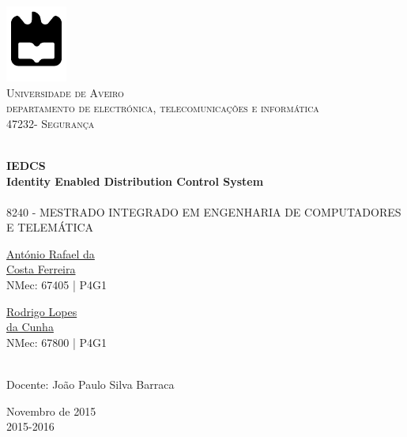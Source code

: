 \begin{titlepage}

\begin{center}

\includegraphics[width=0.15\textwidth]{./logo}\\[0.5cm]    

\textsc{\large Universidade de Aveiro \\[1cm]\large departamento de electrónica, telecomunicações e informática}\\[1cm]

\textsc{\large{47232}\large - Segurança \\[1cm]}

\HRule \\[0.5cm]
{ \huge \bfseries  IEDCS}\\[0.4cm]
{ \large \bfseries Identity Enabled Distribution Control System}\\[0.4cm]
\HRule \\[1cm]

\textsc{\small{8240 - MESTRADO INTEGRADO EM ENGENHARIA DE COMPUTADORES E TELEMÁTICA}}\\[1cm]

\begin{minipage}{0.4\textwidth}

\begin{flushleft} \large
\href{mailto:rafael.ferreira@ua.pt}{António Rafael da \\ Costa Ferreira }
 \small{\\NMec: 67405 | P4G1}
\end{flushleft}
\end{minipage}
\begin{minipage}{0.4\textwidth}

\begin{flushright} \large
\href{mailto:rodrigocunha@ua.pt}{Rodrigo Lopes \\ da Cunha}
\small{\\NMec: 67800 | P4G1}
\end{flushright}
\end{minipage}\\[1cm]

{\large Docente: João Paulo Silva Barraca   }\\[0.5cm]

\vfill

{\large Novembro de 2015 \\ 2015-2016}

\end{center}

\end{titlepage}
